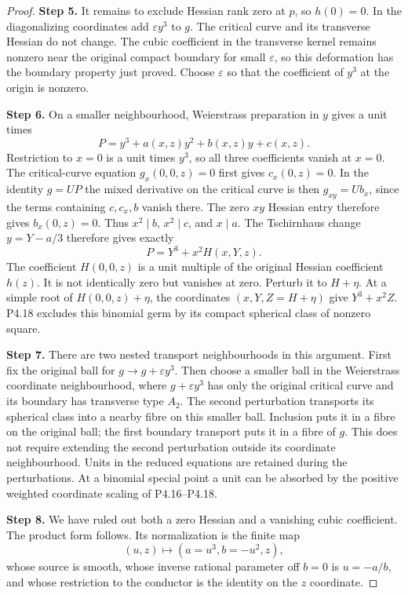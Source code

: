 \begin{proof}
\noindent\textbf{Step 5.} It remains to exclude Hessian rank
zero at $p$, so $h(0)=0$. In the
diagonalizing coordinates add
$\varepsilon y^3$ to $g$. The
critical curve and its transverse
Hessian do not change. The cubic
coefficient in the transverse kernel
remains nonzero near the original
compact boundary for small
$\varepsilon$, so this deformation
has the boundary property just proved.
Choose $\varepsilon$ so that the
coefficient of $y^3$ at the origin
is nonzero.

\noindent\textbf{Step 6.} On a smaller neighbourhood, Weierstrass
preparation in $y$ gives a unit times
\[
 P=y^3+a(x,z)y^2+b(x,z)y+c(x,z).
\]
Restriction to $x=0$ is a unit times
$y^3$, so all three coefficients
vanish at $x=0$. The critical-curve
equation $g_x(0,0,z)=0$ first gives
$c_x(0,z)=0$. In the identity
$g=U P$ the mixed derivative on
the critical curve is then
$g_{xy}=U b_x$, since the terms
containing $c,c_x,b$ vanish there.
The zero $xy$ Hessian entry therefore
gives $b_x(0,z)=0$. Thus
$x^2\mid b$, $x^2\mid c$, and
$x\mid a$.
The Tschirnhaus change $y=Y-a/3$
therefore gives exactly
\[
 P=Y^3+x^2H(x,Y,z).
\]
The coefficient $H(0,0,z)$ is a unit
multiple of the original Hessian
coefficient $h(z)$. It is not
identically zero but vanishes at
zero. Perturb it to $H+\eta$.
At a simple root of
$H(0,0,z)+\eta$, the coordinates
$(x,Y,Z=H+\eta)$ give
$Y^3+x^2Z$. P4.18 excludes this
binomial germ by its compact
spherical class of nonzero square.

\noindent\textbf{Step 7.} There are two nested transport
neighbourhoods in this argument.
First fix the original ball for
$g\to g+\varepsilon y^3$.
Then choose a smaller ball in the
Weierstrass coordinate neighbourhood,
where $g+\varepsilon y^3$ has only
the original critical curve and its
boundary has transverse type $A_2$.
The second perturbation transports
its spherical class into a nearby
fibre on this smaller ball. Inclusion
puts it in a fibre on the original
ball; the first boundary transport
puts it in a fibre of $g$.
This does not require extending the
second perturbation outside its
coordinate neighbourhood.
Units in the reduced equations are
retained during the perturbations.
At a binomial special point a unit
can be absorbed by the positive
weighted coordinate scaling of
P4.16--P4.18.

\noindent\textbf{Step 8.} We have ruled out both a zero
Hessian and a vanishing cubic
coefficient. The product form
follows. Its normalization is
the finite map
\[
 (u,z)\longmapsto (a=u^3,b=-u^2,z),
\]
whose source is smooth, whose
inverse rational parameter off
$b=0$ is $u=-a/b$, and whose
restriction to the conductor is
the identity on the $z$ coordinate.
\end{proof}

